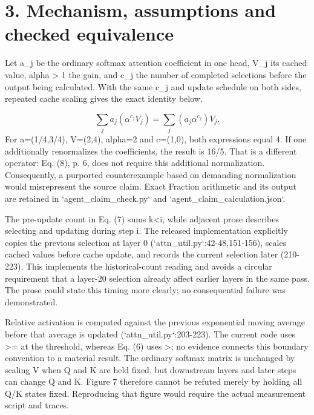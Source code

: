 \documentclass[10pt]{article}
\begin{document}
\section*{3. Mechanism, assumptions and checked equivalence}
Let a\_j be the ordinary softmax attention coefficient in one head, V\_j its cached value, alpha > 1 the gain, and c\_j the number of completed selections before the output being calculated. With the same c\_j and update schedule on both sides, repeated cache scaling gives the exact identity below.\par
\[\sum_j a_j\left(\alpha^{c_j}V_j\right)=\sum_j\left(a_j\alpha^{c_j}\right)V_j.\] For a=(1/4,3/4), V=(2,4), alpha=2 and c=(1,0), both expressions equal 4. If one additionally renormalizes the coefficients, the result is 16/5. That is a different operator: Eq. (8), p. 6, does not require this additional normalization. Consequently, a purported counterexample based on demanding normalization would misrepresent the source claim. Exact Fraction arithmetic and its output are retained in `agent\_claim\_check.py` and `agent\_claim\_calculation.json`.\par
The pre-update count in Eq. (7) sums k<i, while adjacent prose describes selecting and updating during step i. The released implementation explicitly copies the previous selection at layer 0 (`attn\_util.py`:42-48,151-156), scales cached values before cache update, and records the current selection later (210-223). This implements the historical-count reading and avoids a circular requirement that a layer-20 selection already affect earlier layers in the same pass. The prose could state this timing more clearly; no consequential failure was demonstrated.\par
Relative activation is computed against the previous exponential moving average before that average is updated (`attn\_util.py`:203-223). The current code uses >= at the threshold, whereas Eq. (6) uses >; no evidence connects this boundary convention to a material result. The ordinary softmax matrix is unchanged by scaling V when Q and K are held fixed, but downstream layers and later steps can change Q and K. Figure 7 therefore cannot be refuted merely by holding all Q/K states fixed. Reproducing that figure would require the actual measurement script and traces.\par
\end{document}
